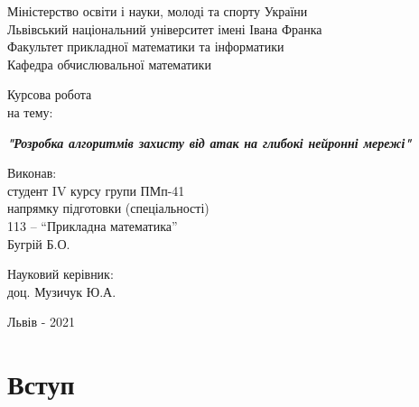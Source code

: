 \documentclass[14pt,a4paper]{extarticle}
\newcounter{e}
\newcounter{tabl}
\numberwithin{equation}{section}
\numberwithin{figure}{section}
\begin{document}
	

 \thispagestyle{empty}

 \begin{center}
	\large
	Міністерство освіти і науки, молоді та спорту України \\
	Львівський національний університет імені Івана Франка \\
	Факультет прикладної математики та інформатики \\
	Кафедра обчислювальної математики
 \end{center}

 \vspace{45pt}

 \vfill

 \begin{center}
	{\Huge{Курсова робота}}\\
	{\large на тему:}
 \end{center}

 \begin{center}\Large
	\textbf{\emph{"Розробка алгоритмів захисту від атак на глибокі нейронні мережі"}}
 \end{center}

 \vfill
 \vskip100pt

 \begin{flushleft}
	\hskip8cm 
	Виконав:
	\\ \hskip8cm 
	студент IV курсу групи ПМп-41
	\\ \hskip8cm
	напрямку підготовки (спеціальності)
	\\ \hskip8cm
	113 -- ``Прикладна математика''
	\\ \hskip8cm
	Бугрій Б.О.
 \end{flushleft}

 \begin{flushleft}
	\hskip8cm 
	Науковий керівник:
	\\ \hskip8cm
	доц. Музичук Ю.А.
 \end{flushleft}

 \vfill

 \begin{center}
	\large
	Львів - 2021
 \end{center}

 \newpage
 \thispagestyle{empty}
 \tableofcontents

 \newpage
 \thispagestyle{empty}
 \section*{Вступ}
 \begin{center}\end{center}
\end{document}
